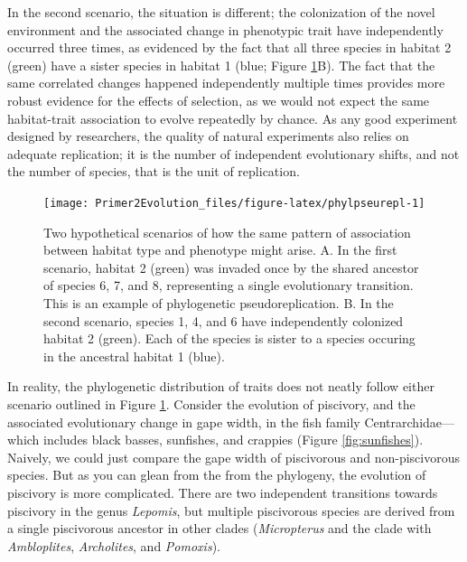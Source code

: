\documentclass[
]{book}
\begin{document}
In the second scenario, the situation is different; the colonization of the novel environment and the associated change in phenotypic trait have independently occurred three times, as evidenced by the fact that all three species in habitat 2 (green) have a sister species in habitat 1 (blue; Figure \ref{fig:phylpseurepl}B). The fact that the same correlated changes happened independently multiple times provides more robust evidence for the effects of selection, as we would not expect the same habitat-trait association to evolve repeatedly by chance. As any good experiment designed by researchers, the quality of natural experiments also relies on adequate replication; it is the number of independent evolutionary shifts, and not the number of species, that is the unit of replication.

\begin{figure}
\texttt{[image: Primer2Evolution\_files/figure-latex/phylpseurepl-1]} \caption{Two hypothetical scenarios of how the same pattern of association between habitat type and phenotype might arise. A. In the first scenario, habitat 2 (green) was invaded once by the shared ancestor of species 6, 7, and 8, representing a single evolutionary transition. This is an example of phylogenetic pseudoreplication. B. In the second scenario, species 1, 4, and 6 have independently colonized habitat 2 (green). Each of the species is sister to a species occuring in the ancestral habitat 1 (blue).}\label{fig:phylpseurepl}
\end{figure}

In reality, the phylogenetic distribution of traits does not neatly follow either scenario outlined in Figure \ref{fig:phylpseurepl}. Consider the evolution of piscivory, and the associated evolutionary change in gape width, in the fish family Centrarchidae---which includes black basses, sunfishes, and crappies (Figure \ref{fig:sunfishes}). Naively, we could just compare the gape width of piscivorous and non-piscivorous species. But as you can glean from the from the phylogeny, the evolution of piscivory is more complicated. There are two independent transitions towards piscivory in the genus \emph{Lepomis}, but multiple piscivorous species are derived from a single piscivorous ancestor in other clades (\emph{Micropterus} and the clade with \emph{Ambloplites}, \emph{Archolites}, and \emph{Pomoxis}).
\end{document}
